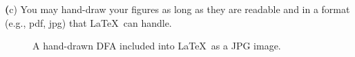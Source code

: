\documentclass[11pt]{article}
\renewcommand{\part}[1] {{\vspace{0.15in}\noindent\textbf (#1)} \vspace{0.10in}}
\begin{document}
\part{c} You may hand-draw your figures as long as they are readable and in a format (e.g., pdf, jpg) that \LaTeX\ can handle.
\begin{figure}[h]
\centering 
{}
\caption{A hand-drawn DFA included into \LaTeX\ as a JPG image.}	
\end{figure}
\end{document}
